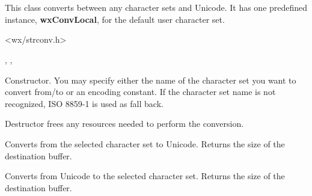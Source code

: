 %
%

\section{}\label{wxcsconv}

This class converts between any character sets and Unicode.
It has one predefined instance, {\bf wxConvLocal}, for the
default user character set.




<wx/strconv.h>


, 
, 


\label{wxcsconvwxcsconv}



Constructor. You may specify either the name of the character set you want to
convert from/to or an encoding constant. If the character set name is not
recognized, ISO 8859-1 is used as fall back.


\label{wxcsconvdtor}


Destructor frees any resources needed to perform the conversion.


\label{wxcsconvmb2wc}


Converts from the selected character set to Unicode. Returns the size of the destination buffer.


\label{wxcsconvwc2mb}


Converts from Unicode to the selected character set. Returns the size of the destination buffer.


